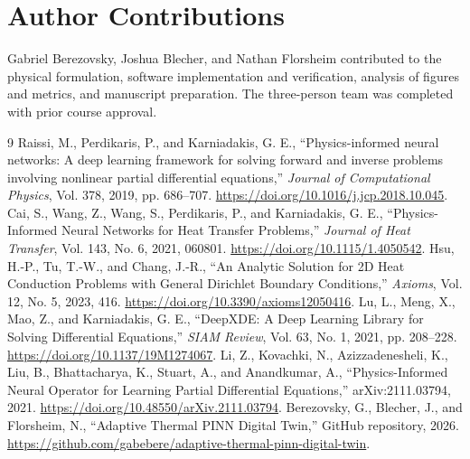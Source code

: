 \documentclass[journal]{new-aiaa}
\begin{document}
\section*{Author Contributions}
Gabriel Berezovsky, Joshua Blecher, and Nathan Florsheim contributed to the physical formulation, software implementation and verification, analysis of figures and metrics, and manuscript preparation. The three-person team was completed with prior course approval.

\begin{thebibliography}{9}
\footnotesize
{} Raissi, M., Perdikaris, P., and Karniadakis, G. E., ``Physics-informed neural networks: A deep learning framework for solving forward and inverse problems involving nonlinear partial differential equations,'' \textit{Journal of Computational Physics}, Vol. 378, 2019, pp. 686--707. \url{https://doi.org/10.1016/j.jcp.2018.10.045}.
 Cai, S., Wang, Z., Wang, S., Perdikaris, P., and Karniadakis, G. E., ``Physics-Informed Neural Networks for Heat Transfer Problems,'' \textit{Journal of Heat Transfer}, Vol. 143, No. 6, 2021, 060801. \url{https://doi.org/10.1115/1.4050542}.
 Hsu, H.-P., Tu, T.-W., and Chang, J.-R., ``An Analytic Solution for 2D Heat Conduction Problems with General Dirichlet Boundary Conditions,'' \textit{Axioms}, Vol. 12, No. 5, 2023, 416. \url{https://doi.org/10.3390/axioms12050416}.
 Lu, L., Meng, X., Mao, Z., and Karniadakis, G. E., ``DeepXDE: A Deep Learning Library for Solving Differential Equations,'' \textit{SIAM Review}, Vol. 63, No. 1, 2021, pp. 208--228. \url{https://doi.org/10.1137/19M1274067}.
 Li, Z., Kovachki, N., Azizzadenesheli, K., Liu, B., Bhattacharya, K., Stuart, A., and Anandkumar, A., ``Physics-Informed Neural Operator for Learning Partial Differential Equations,'' arXiv:2111.03794, 2021. \url{https://doi.org/10.48550/arXiv.2111.03794}.
 Berezovsky, G., Blecher, J., and Florsheim, N., ``Adaptive Thermal PINN Digital Twin,'' GitHub repository, 2026. \url{https://github.com/gabebere/adaptive-thermal-pinn-digital-twin}.
\end{thebibliography}
\end{document}
